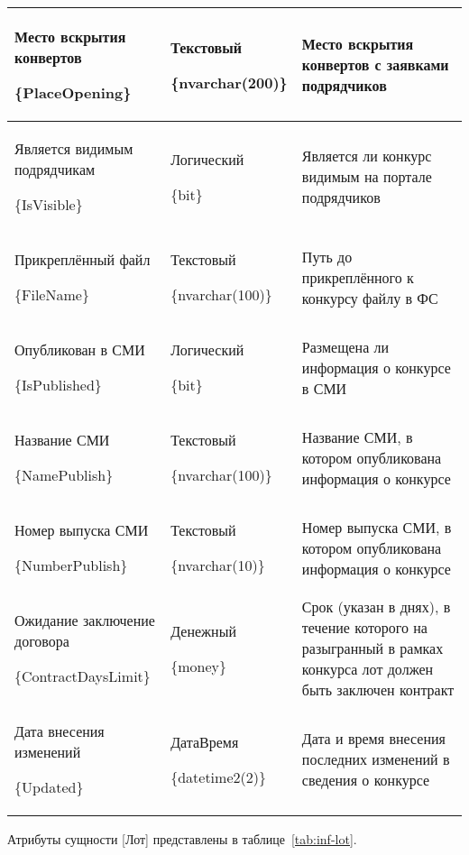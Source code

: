 \begin{myTable}
\begin{longtable}[h]{|p{}|p{}|p{}|}
	Место вскрытия конвертов \par \{PlaceOpening\} & Текстовый \par \{nvarchar(200)\} & Место вскрытия конвертов с заявками подрядчиков \\ \hline
	Является видимым подрядчикам \par \{IsVisible\} & Логический \par \{bit\} & Является ли конкурс видимым на портале подрядчиков \\ \hline
	Прикреплённый файл \par \{FileName\} & Текстовый \par \{nvarchar(100)\} & Путь до прикреплённого к конкурсу файлу в ФС \\ \hline
	Опубликован в СМИ \par \{IsPublished\} & Логический \par \{bit\} & Размещена ли информация о конкурсе в СМИ \\ \hline
	Название СМИ \par \{NamePublish\} & Текстовый \par \{nvarchar(100)\} & Название СМИ, в котором опубликована информация о конкурсе \\ \hline
	Номер выпуска СМИ \par \{NumberPublish\} & Текстовый \par \{nvarchar(10)\} & Номер выпуска СМИ, в котором опубликована информация о конкурсе \\ \hline
	Ожидание заключение договора \par \{ContractDaysLimit\} & Денежный \par \{money\} & Срок (указан в днях), в течение которого на разыгранный в рамках конкурса лот должен быть заключен контракт \\ \hline
	Дата внесения изменений \par \{Updated\} & ДатаВремя \par \{datetime2(2)\} & Дата и время внесения последних изменений в сведения о конкурсе \\ \hline
\end{longtable}
\end{myTable}

Атрибуты сущности [Лот] представлены в таблице~\ref{tab:inf-lot}.


